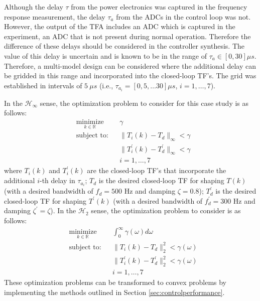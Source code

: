 \documentclass[a4paper, 10pt, conference]{ieeeconf}
\begin{document}
Although the delay $\tau$ from the power electronics was captured in the frequency response measurement, the delay $\tau_{a}$ from the ADCs in the control loop was not. However, the output of the TFA includes an ADC which is captured in the experiment, an ADC that is not present during normal operation. Therefore the difference of these delays should be considered in the controller synthesis. The value of this delay is uncertain and is known to be in the range of $\tau_{a} \in [0,30]\mu s$. Therefore, a multi-model design can be considered where the additional delay can be gridded in this range and incorporated into the closed-loop TF's. The grid was established in intervals of $5 \: \mu s$ (i.e., $\tau_{a_i} = [0,5,\ldots30] \mu s$, $i = 1,\ldots,7$).  

In the $\mathcal{H}_{\infty}$ sense, the optimization problem to consider for this case study is as follows:
 \begin{equation} \label{eq:case_study_opt}
\begin{aligned}
& \underset{ k \in \mathbb{R}}{\text{minimize}}
& & \gamma  \\
& \text{subject to:} & & \|T_i(k)-T_d\|_{\infty}< \gamma \\
& &  &\|T_i^{\prime}(k)-T_d^{\prime}\|_{\infty}< \gamma \\ 
& & & i = 1,\ldots,7
\end{aligned}
\end{equation}
where $T_i(k)$ and $T_i^{\prime}(k)$ are the closed-loop TF's that incorporate the additional $i$-th delay in $\tau_{a_i}$; $T_d$ is the desired closed-loop TF for shaping $T(k)$ (with a desired bandwidth of $f_d = 500$ Hz and damping $\zeta = 0.8$); $T_d^{\prime}$ is the desired closed-loop TF for shaping $T^{\prime}(k)$ (with a desired bandwidth of $f_d^{\prime} = 300$ Hz and damping $\zeta^{\prime} = \zeta$). In the $\mathcal{H}_2$ sense, the optimization problem to consider is as follows:
\begin{equation} \label{eq:case_study_opt_2}
\begin{aligned}
& \underset{ k \in \mathbb{R}}{\text{minimize}}
& & \int_0^{\infty} \gamma(\omega) d\omega  \\
& \text{subject to:} & & \|T_i(k)-T_d\|_2^2< \gamma(\omega) \\
& &  &\|T_i^{\prime}(k)-T_d^{\prime}\|_2^2< \gamma(\omega) \\ 
& & & i = 1,\ldots,7
\end{aligned}
\end{equation}
These optimization problems can be transformed to convex problems by implementing the methods outlined in Section \ref{sec:controlperformance}. 
\end{document}
